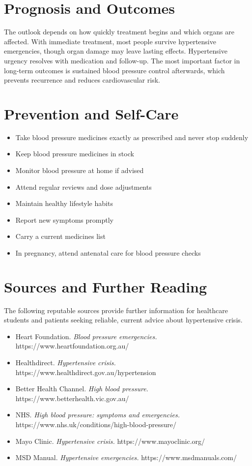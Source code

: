\section*{Prognosis and Outcomes}
The outlook depends on how quickly treatment begins and which organs are affected. With immediate treatment, most people survive hypertensive emergencies, though organ damage may leave lasting effects. Hypertensive urgency resolves with medication and follow-up. The most important factor in long-term outcomes is sustained blood pressure control afterwards, which prevents recurrence and reduces cardiovascular risk.

\section*{Prevention and Self-Care}
\begin{itemize}
    \item Take blood pressure medicines exactly as prescribed and never stop suddenly
    \item Keep blood pressure medicines in stock
    \item Monitor blood pressure at home if advised
    \item Attend regular reviews and dose adjustments
    \item Maintain healthy lifestyle habits
    \item Report new symptoms promptly
    \item Carry a current medicines list
    \item In pregnancy, attend antenatal care for blood pressure checks
\end{itemize}

\section*{Sources and Further Reading}
The following reputable sources provide further information for healthcare students and patients seeking reliable, current advice about hypertensive crisis.

\begin{itemize}
    \item Heart Foundation. \textit{Blood pressure emergencies.} https://www.heartfoundation.org.au/
    \item Healthdirect. \textit{Hypertensive crisis.} https://www.healthdirect.gov.au/hypertension
    \item Better Health Channel. \textit{High blood pressure.} https://www.betterhealth.vic.gov.au/
    \item NHS. \textit{High blood pressure: symptoms and emergencies.} https://www.nhs.uk/conditions/high-blood-pressure/
    \item Mayo Clinic. \textit{Hypertensive crisis.} https://www.mayoclinic.org/
    \item MSD Manual. \textit{Hypertensive emergencies.} https://www.msdmanuals.com/
\end{itemize}
